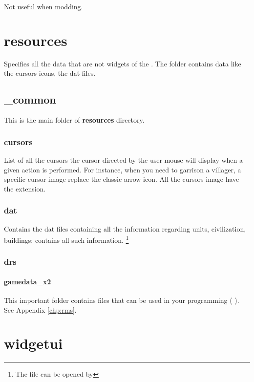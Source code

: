     Not useful when modding.

    \section{resources}

    Specifies all the data that are not widgets of the . The folder contains data like the cursors icons, the \genie{} dat files.

    \subsection{\_common}

    This is the main folder of \textbf{resources} directory.

    \subsubsection{cursors}

    List of all the cursors the cursor directed by the user mouse will display when a given action is performed. For instance, when you need to garrison a villager, a specific cursor image replace the classic arrow icon. All the cursors image have the  extension.

    \subsubsection{dat}

    Contains the dat files containing all the information regarding units, civilization, buildings:  contains all such information. \footnote{The file can be opened by \genie{}}

    \subsubsection{drs}

    \paragraph{gamedata\_x2}

    This important folder contains  files that can be used in your  programming (\eg{} ). See Appendix \ref{chp:rms}.

    \section{widgetui}

